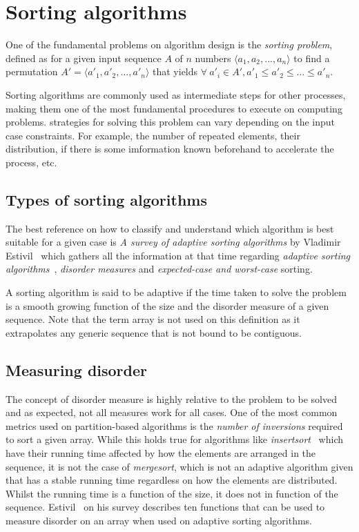 \section{Sorting algorithms}
One of the fundamental problems on algorithm design is the \textit{sorting problem}, defined as for a given input sequence $A$ of $n$ numbers $\langle a_1, a_2,...,a_n \rangle$ to find a permutation $A' = \langle a'_1, a'_2,...,a'_n \rangle$ that yields $\forall~a'_i \in A', a'_1 \leq a'_2 \leq ... \leq a'_n $.

Sorting algorithms are commonly used as intermediate steps for other processes, making them one of the most fundamental procedures to execute on computing problems. strategies for solving this problem can vary depending on the input case constraints. For example, the number of repeated elements, their distribution, if there is some imformation known beforehand to accelerate the process, etc.

\subsection{Types of sorting algorithms}
The best reference on how to classify and understand which algorithm is best suitable for a given case is \textit{A survey of adaptive sorting algorithms} by Vladimir Estivil~\cite{estivil92} which gathers all the information at that time regarding \textit{adaptive sorting algorithms}~\cite{Mehlhorn_1984}, \textit{disorder measures} and \textit{expected-case and worst-case} sorting.

A sorting algorithm is said to be adaptive if the time taken to solve the problem is a smooth growing function of the size and the disorder measure of a given sequence. Note that the term array is not used on this definition as it extrapolates any generic sequence that is not bound to be contiguous.

\subsection{Measuring disorder}
\label{SEC:MEASURING_DISORDER}
The concept of disorder measure is highly relative to the problem to be solved and as expected, not all measures work for all cases. One of the most common metrics used on partition-based algorithms is the \textit{number of inversions} required to sort a given array. While this holds true for algorithms like \textit{insertsort}~\cite{10.5555/150918} which have their running time affected by how the elements are arranged in the sequence, it is not the case of \textit{mergesort}, which is not an adaptive algorithm given that has a stable running time regardless on how the elements are distributed. Whilst the running time is a function of the size, it does not in function of the sequence. Estivil~\cite{estivil92} on his survey describes ten functions that can be used to measure disorder on an array when used on adaptive sorting algorithms.

